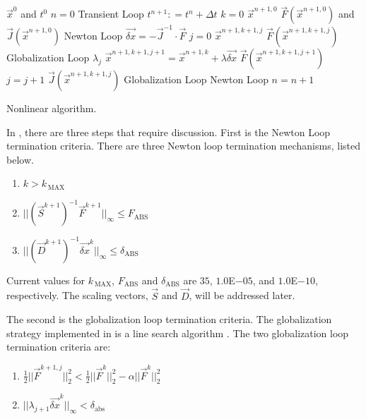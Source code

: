 \begin{algo}[H]
\setlength{\baselineskip}{0.625\baselineskip}
\begin{algorithmic}[1]
\Require $\vec{x}^{0}$ and $t^{0}$
\Set $n = 0$
\Loop \; Transient Loop
    \State $t^{n+1} : = t^{n} + \Delta t$
    \State $k = 0$
    \Define $\vec{x}^{n+1,0}$
	\Calculate $\vec{F}(\vec{x}^{n+1,0})$ and $\vec{J}(\vec{x}^{n+1,0})$
    \Loop \; Newton Loop
		\Calculate $\vec{\delta x} = - \vec{J}^{-1}\cdot\vec{F}$
		$j = 0$		
		\Calculate $\vec{x}^{n+1,k+1,j}$
		\Calculate $\vec{F}(\vec{x}^{n+1,k+1,j})$
		\Loop \; Globalization Loop
				\Calculate $\lambda_j$
				\Calculate $\vec{x}^{n+1,k+1,j+1} = \vec{x}^{n+1,k} + \lambda \vec{\delta x}$
				\Calculate $\vec{F}(\vec{x}^{n+1,k+1,j+1})$
				\State $j = j + 1$			
			\Else
				\Calculate $\vec{J}(\vec{x}^{n+1,k+1,j})$
				\Exit Globalization Loop
			\EndIf
		\EndLoop			
			\Exit Newton Loop
		\EndIf
	\EndLoop
	\State $n = n + 1$
\EndLoop
\end{algorithmic}
\caption{Nonlinear \cobra{} algorithm.}
\label{alg:nl_cobra}
\end{algo}

In , there are three steps that require discussion.
First is the Newton Loop termination criteria.
There are three Newton loop termination mechanisms, listed below.

\begin{enumerate}
\item{$k > k_{\,\text{MAX}}$}
\item{$||(\vec{S}^{k+1})^{-1}\vec{F}^{k+1}||_{\infty} \leq F_{\text{ABS}}$}
\item{$||(\vec{D}^{k+1})^{-1}\vec{\delta x}^{k}||_{\infty} \leq \delta_{\text{ABS}}$}
\end{enumerate}

Current values for $k_{\,\text{MAX}}$, $F_{\text{ABS}}$ and $\delta_{\text{ABS}}$ are $35$, $1.0$E$-05$, and $1.0$E$-10$, respectively.
The scaling vectors, $\vec{S}$ and $\vec{D}$, will be addressed later.

The second is the globalization loop termination criteria.
The globalization strategy implemented in \cobra{} is a line search algorithm \cite{Dennis1996}.
The two globalization loop termination criteria are:

\begin{enumerate}
\item{$\frac{1}{2}||\vec{F}^{k+1, j}||^{2}_{2} < \frac{1}{2}||\vec{F}^{k}||^{2}_{2} - \alpha ||\vec{F}^{k}||^{2}_{2}$ }
\item{$||\lambda_{j+1} \vec{\delta x}^{k}||_{\infty} < \delta_{\text{abs}}$}
\end{enumerate}

